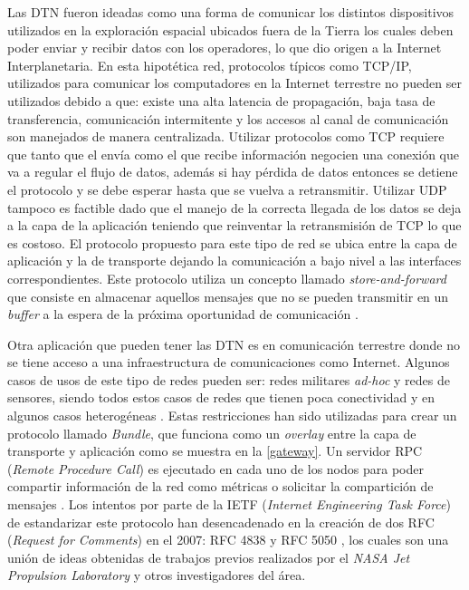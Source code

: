 
Las DTN fueron ideadas como una forma de comunicar los distintos dispositivos
utilizados en la exploración espacial ubicados fuera de la Tierra los cuales
deben poder enviar y recibir datos con los operadores, lo que dio origen a la
Internet Interplanetaria.  En esta hipotética red, protocolos típicos como
TCP/IP, utilizados para comunicar los computadores en la Internet terrestre no
pueden ser utilizados debido a que: existe una alta latencia de propagación,
baja tasa de transferencia, comunicación intermitente y los accesos al canal de
comunicación son manejados de manera centralizada.  Utilizar protocolos como TCP
requiere que tanto que el envía como el que recibe información negocien una
conexión que va a regular el flujo de datos, además si hay pérdida de datos
entonces se detiene el protocolo y se debe esperar hasta que se vuelva a
retransmitir. Utilizar UDP tampoco es factible dado que el manejo de la correcta
llegada de los datos se deja a la capa de la aplicación teniendo que reinventar
la retransmisión de TCP lo que es costoso. El protocolo propuesto para este tipo
de red se ubica entre la capa de aplicación y la de transporte dejando la
comunicación a bajo nivel a las interfaces correspondientes. Este protocolo
utiliza un concepto llamado \textit{store-and-forward} que consiste en almacenar
aquellos mensajes que no se pueden transmitir en un \textit{buffer} a la espera
de la próxima oportunidad de comunicación \cite{burleigh_delay-tolerant_2003}.


Otra aplicación que pueden tener las DTN es en comunicación terrestre donde no
se tiene acceso a una infraestructura de comunicaciones como Internet.  Algunos
casos de usos de este tipo de redes pueden ser: redes militares \textit{ad-hoc}
y redes de sensores, siendo todos estos casos de redes que tienen poca
conectividad y en algunos casos heterogéneas \cite{fall_delay-tolerant_2003}.
Estas restricciones han sido utilizadas para crear un protocolo llamado
\textit{Bundle}, que funciona como un \textit{overlay} entre la capa de
transporte y aplicación como se muestra en la \ref{gateway}.  Un servidor RPC
(\textit{Remote Procedure Call}) es ejecutado en cada uno de los nodos para
poder compartir información de la red como métricas o solicitar la compartición
de mensajes \cite{RFC5050}. Los intentos por parte de la IETF (\textit{Internet
Engineering Task Force}) de estandarizar este protocolo han desencadenado en la
creación de dos RFC (\textit{Request for Comments}) en el 2007: RFC 4838
\cite{RFC4838} y RFC 5050 \cite{RFC5050}, los cuales son una unión de ideas
obtenidas de trabajos previos realizados por el \textit{NASA Jet Propulsion
Laboratory} y otros investigadores del área.

